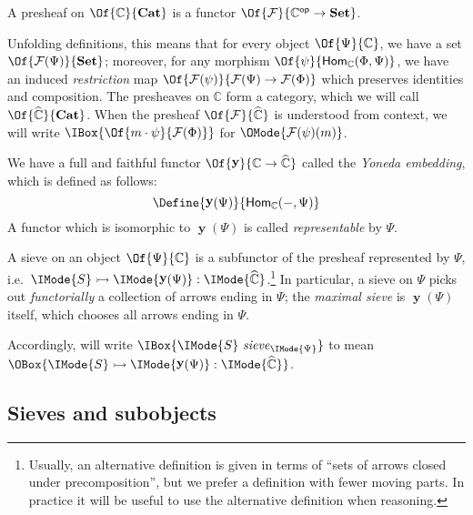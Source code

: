 \documentclass{article}
\newcommand\Cats{\mathbf{Cat}}
\newcommand\Sets{\mathbf{Set}}
\newcommand\OpCat[1]{{{#1}^{\mathsf{op}}}}
\newcommand\Hom[3]{\mathsf{Hom}_{#1} (#2, #3)}
\DeclareMathOperator\OpYoneda{\mathbf{y}}
\newcommand\Yoneda[1]{\OpYoneda({#1})}
\newcommand\Psh[1]{\widehat{#1}}
\newcommand\IsSubobject[3]{\IMode{#1}\rightarrowtail\IMode{#2}:\IMode{#3}}
\newcommand\IsSieve[2]{\IMode{#2}\ \mathit{sieve}_{\IMode{#1}}}
\begin{document}
\begin{definition}[Presheaf]
  A presheaf on $\Of{\mathbb{C}}{\Cats}$ is a functor
  $\Of{\mathcal{F}}{\OpCat{\mathbb{C}}\to\Sets}$.
\end{definition}

Unfolding definitions, this means that for every object
$\Of{\Psi}{\mathbb{C}}$, we have a set
$\Of{\mathcal{F}(\Psi)}{\Sets}$; moreover, for any morphism
$\Of{\psi}{\Hom{\mathbb{C}}{\Phi}{\Psi}}$, we have an induced
\emph{restriction} map
$\Of{\mathcal{F}(\psi)}{\mathcal{F}(\Psi)\to \mathcal{F}(\Phi)}$ which preserves
identities and composition.
%
The presheaves on $\mathbb{C}$ form a category, which we will call
$\Of{\Psh{\mathbb{C}}}{\Cats}$.  When the presheaf
$\Of{\mathcal{F}}{\Psh{\mathbb{C}}}$ is understood from context, we
will write $\IBox{\Of{m\cdot \psi}{\mathcal{F}(\Phi)}}$ for
$\OMode{\mathcal{F}(\psi)(m)}$.

\begin{definition}
  We have a full and faithful functor
  $\Of{\OpYoneda}{\mathbb{C}\to\Psh{\mathbb{C}}}$ called the
  \emph{Yoneda embedding}, which is defined as follows:
  \[
    \Define{
      \Yoneda{\Psi}
    }{
      \Hom{\mathbb{C}}{-}{\Psi}
    }
  \]
  A functor which is isomorphic to $\Yoneda{\Psi}$ is called
  \emph{representable} by $\Psi$.
\end{definition}

\begin{definition}[Sieve]
  A sieve on an object $\Of{\Psi}{\mathbb{C}}$ is a subfunctor of the
  presheaf represented by $\Psi$, i.e.\
  $\IsSubobject{S}{\Yoneda{\Psi}}{\Psh{\mathbb{C}}}$.\footnote{Usually, an alternative
    definition is given in terms of ``sets of arrows closed under
    precomposition'', but we prefer a definition with fewer moving
    parts. In practice it will be useful to use the alternative
    definition when reasoning.}
%
  In particular, a sieve on $\Psi$ picks out \emph{functorially} a
  collection of arrows ending in $\Psi$; the \emph{maximal sieve} is
  $\Yoneda{\Psi}$ itself, which chooses all arrows ending in $\Psi$.
\end{definition}

Accordingly, will write $\IBox{\IsSieve{\Psi}{S}}$ to mean
$\OBox{\IsSubobject{S}{\Yoneda{\Psi}}{\Psh{\mathbb{C}}}}$.

\subsection{Sieves and subobjects}
\end{document}
